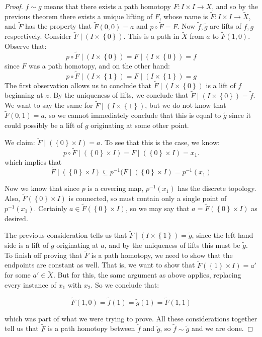     \begin{proof}
    $f\sim g$ means that there exists a path homotopy $F\colon I\times I\to X$, and so by the previous theorem there exists a unique lifting of $F$, whose name is $\tilde{F}\colon I\times I\to \tilde{X}$, and $\tilde{F}$ has the property that $\tilde{F}(0,0)=a$ and $p\circ \tilde{F}=F$. Now $\tilde{f}, \tilde{g}$ are lifts of $f,g$ respectively. Consider $\tilde{F}\mid (I\times \left\{0\right\})$. This is a path in $\tilde{X}$ from $a$ to $\tilde{F}(1,0)$. Observe that:
    \[p\circ \tilde{F}\mid (I\times \left\{0\right\})=F\mid (I\times \left\{0\right\})=f \]
since $F$ was a path homotopy, and on the other hand:
	\[p\circ \tilde{F}\mid (I\times \left\{1\right\})=F\mid (I\times \left\{1\right\})=g\]
The first observation allows us to conclude that $\tilde{F}\mid (I\times \left\{0\right\})$ is a lift of $f$ beginning at $a$. By the uniqueness of lifts, we conclude that $\tilde{F}\mid (I\times \left\{0\right\})=\tilde{f}$. We want to say the same for $\tilde{F}\mid (I\times \left\{1\right\})$, but we do not know that $\tilde{F}(0,1)=a$, so we cannot immediately conclude that this is equal to $\tilde{g}$ since it could possibly be a lift of $g$ originating at some other point.

We claim: $\tilde{F}\mid (\left\{0\right\} \times I)=a$. To see that this is the case, we know:
	\[p\circ \tilde{F}\mid (\left\{0\right\} \times I)=F\mid(\left\{0\right\} \times I)=x_1.\]
    which implies that
	\[\tilde{F}\mid (\left\{0\right\} \times I)\subseteq p^{-1}(F\mid (\left\{0\right\} \times I)=p^{-1}(x_1)\]

    Now we know that since $p$ is a covering map, $p^{-1}(x_1)$ has the discrete topology. Also, $\tilde{F} (\left\{0\right\} \times I)$ is connected, so must contain only a single point of $p^{-1}(x_1)$. Certainly $a\in \tilde{F}(\left\{0\right\} \times I)$, so we may say that $a=\tilde{F}(\left\{0\right\} \times I)$ as desired.

    The previous consideration tells us that $\tilde{F}\mid (I\times \left\{1\right\})=\tilde{g}$, since the left hand side is a lift of $g$ originating at $a$, and by the uniqueness of lifts this must be $\tilde{g}$. To finish off proving that $\tilde{F}$ is a path homotopy, we need to show that the endpoints are constant as well. That is, we want to show that $\tilde{F}(\left\{1\right\} \times I)=a'$ for some $a'\in \tilde{X}$. But for this, the same argument as above applies, replacing every instance of $x_1$ with $x_2$. So we conclude that: 
    
	\[\tilde{F}(1,0)=\tilde{f}(1)=\tilde{g}(1)=\tilde{F}(1,1)\]
	
    which was part of what we were trying to prove. All these considerations together tell us that $\tilde{F}$ is a path homotopy between $\tilde f$ and $\tilde{g}$, so $\tilde{f}\sim \tilde{g}$ and we are done.
    \end{proof}
    

